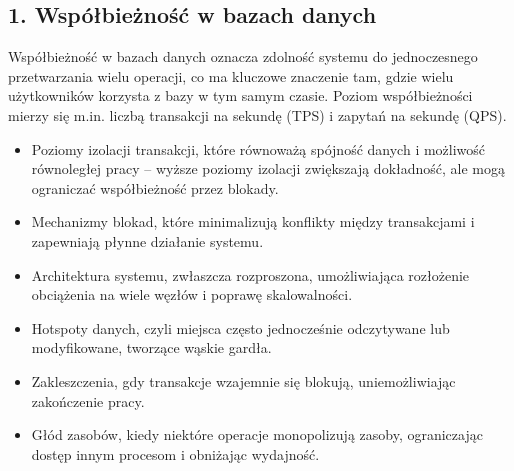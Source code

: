 \documentclass[a4paper,11pt,polish]{sphinxmanual}
\begin{document}
\subsection{1. Współbieżność w bazach danych}
\label{\detokenize{Wydajnosc-Skalowanie-i-Replikacja/index:wspolbieznosc-w-bazach-danych}}
\sphinxAtStartPar
Współbieżność w bazach danych oznacza zdolność systemu do jednoczesnego przetwarzania wielu operacji, co ma kluczowe znaczenie tam, gdzie wielu użytkowników korzysta z bazy w tym samym czasie. Poziom współbieżności mierzy się m.in. liczbą transakcji na sekundę (TPS) i zapytań na sekundę (QPS).
\begin{description}
\begin{itemize}
\item {} 
\sphinxAtStartPar
Poziomy izolacji transakcji, które równoważą spójność danych i możliwość równoległej pracy – wyższe poziomy izolacji zwiększają dokładność, ale mogą ograniczać współbieżność przez blokady.

\item {} 
\sphinxAtStartPar
Mechanizmy blokad, które minimalizują konflikty między transakcjami i zapewniają płynne działanie systemu.

\item {} 
\sphinxAtStartPar
Architektura systemu, zwłaszcza rozproszona, umożliwiająca rozłożenie obciążenia na wiele węzłów i poprawę skalowalności.

\end{itemize}

\begin{itemize}
\item {} 
\sphinxAtStartPar
Hotspoty danych, czyli miejsca często jednocześnie odczytywane lub modyfikowane, tworzące wąskie gardła.

\item {} 
\sphinxAtStartPar
Zakleszczenia, gdy transakcje wzajemnie się blokują, uniemożliwiając zakończenie pracy.

\item {} 
\sphinxAtStartPar
Głód zasobów, kiedy niektóre operacje monopolizują zasoby, ograniczając dostęp innym procesom i obniżając wydajność.

\end{itemize}

\end{description}
\end{document}
